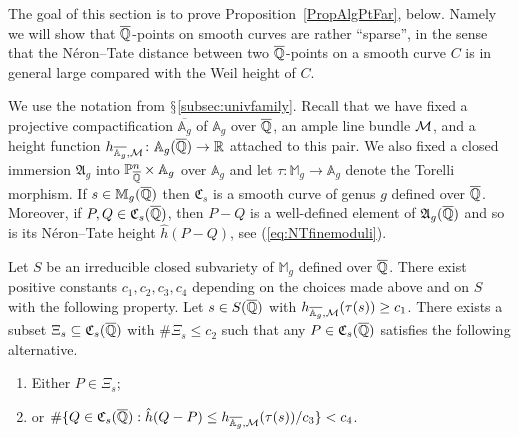 
The goal of this section is to prove Proposition~\ref{PropAlgPtFar}, below.
Namely we will show that ${\overline{\mathbb{Q}}}$-points on smooth curves are
rather ``sparse'', in the sense that the N\'{e}ron--Tate distance
between two ${\overline{\mathbb{Q}}}$-points on a smooth curve $C$ is in
general large compared with the Weil height of $C$. %


We use the notation from $\mathsection$\ref{subsec:univfamily}. Recall
that we have fixed a projective compactification
$\overline{\mathbb{A}_g}$ of $\mathbb{A}_g$ over ${\overline{\mathbb{Q}}}$, an ample
line bundle ${\mathcal M}$, and a height function
$h_{\overline{\mathbb{A}_g},{\mathcal M}} \colon
\mathbb{A}_g({\overline{\mathbb{Q}}})\rightarrow {\mathbb{R}}$ attached to this pair.
We also fixed a closed immersion $\mathfrak{A}_g$ into
${\mathbb{P}}^n_{\overline{\mathbb{Q}}}\times \mathbb{A}_g$ over $\mathbb{A}_g$ and
let $\tau\colon \mathbb{M}_g\rightarrow\mathbb{A}_g$ denote the
Torelli morphism. 
If $s\in \mathbb{M}_g({\overline{\mathbb{Q}}})$ then $\mathfrak{C}_s$
is a smooth curve of genus $g$ defined over ${\overline{\mathbb{Q}}}$.
Moreover, if $P,Q\in \mathfrak{C}_s({\overline{\mathbb{Q}}})$, then $P-Q$ is a
well-defined element of $\mathfrak{A}_g({\overline{\mathbb{Q}}})$ and so is its
N\'eron--Tate height  $\hat h(P-Q)$, see (\ref{eq:NTfinemoduli}).

\begin{proposition}\label{PropAlgPtFar}
  Let $S$ be an irreducible closed subvariety of $\mathbb{M}_g$ defined over ${\overline{\mathbb{Q}}}$. There
  exist positive constants $c_1, c_2, c_3, c_4$ depending on the choices
  made above and on $S$ with the following property. Let $s\in
  S({\overline{\mathbb{Q}}})$ with $h_{\overline{\mathbb{A}_g},{\mathcal M}}(\tau(s))
  \ge c_1$. There exists a subset $\Xi_s \subseteq \mathfrak{C}_s({\overline{\mathbb{Q}}})$
  with $\#\Xi_s\le c_2$ such that any $P \in \mathfrak{C}_s({\overline{\mathbb{Q}}})$
  satisfies the following alternative.
  \begin{enumerate}
  \item[(i)] Either $P \in \Xi_s$;
  \item[(ii)] or $\#\{Q \in \mathfrak{C}_s({\overline{\mathbb{Q}}}) : \hat{h}(Q-P) \le h_{\overline{\mathbb{A}_g},{\mathcal M}}(\tau(s))/c_3\} < c_4$.
  \end{enumerate}
\end{proposition}

